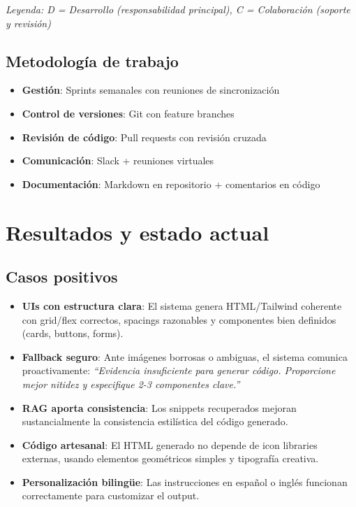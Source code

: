 \documentclass[12pt,a4paper]{article}
\begin{document}
\textit{Leyenda: D = Desarrollo (responsabilidad principal), C = Colaboración (soporte y revisión)}

\subsection{Metodología de trabajo}

\begin{itemize}
    \item \textbf{Gestión}: Sprints semanales con reuniones de sincronización
    \item \textbf{Control de versiones}: Git con feature branches
    \item \textbf{Revisión de código}: Pull requests con revisión cruzada
    \item \textbf{Comunicación}: Slack + reuniones virtuales
    \item \textbf{Documentación}: Markdown en repositorio + comentarios en código
\end{itemize}

\section{Resultados y estado actual}

\subsection{Casos positivos}

\begin{itemize}
    \item \textbf{UIs con estructura clara}: El sistema genera HTML/Tailwind coherente con grid/flex correctos, spacings razonables y componentes bien definidos (cards, buttons, forms).
    
    \item \textbf{Fallback seguro}: Ante imágenes borrosas o ambiguas, el sistema comunica proactivamente: \textit{``Evidencia insuficiente para generar código. Proporcione mejor nitidez y especifique 2-3 componentes clave.''}
    
    \item \textbf{RAG aporta consistencia}: Los snippets recuperados mejoran sustancialmente la consistencia estilística del código generado.
    
    \item \textbf{Código artesanal}: El HTML generado no depende de icon libraries externas, usando elementos geométricos simples y tipografía creativa.
    
    \item \textbf{Personalización bilingüe}: Las instrucciones en español o inglés funcionan correctamente para customizar el output.
\end{itemize}
\end{document}
